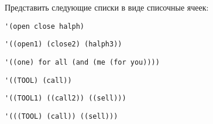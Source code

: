 Представить следующие списки в виде списочные ячеек:

\verb|'(open close halph)|

\begin{figure}[h]
    \centering
    \def\svgwidth{0.8\textwidth}
    
\end{figure}

\verb|'((open1) (close2) (halph3))|

\begin{figure}[h]
    \centering
    \def\svgwidth{0.8\textwidth}
    
\end{figure}

\verb|'((one) for all (and (me (for you))))|

\begin{figure}[h]
    \centering
    \def\svgwidth{\textwidth}
    
\end{figure}

\verb|'((TOOL) (call))|

\begin{figure}[h!]
    \centering
    \def\svgwidth{0.8\textwidth}
    
\end{figure}

\pagebreak

\verb|'((TOOL1) ((call2)) ((sell)))|

\begin{figure}[h]
    \centering
    \def\svgwidth{0.9\textwidth}
    
\end{figure}

\verb|'(((TOOL) (call)) ((sell)))|

\begin{figure}[h]
    \centering
    \def\svgwidth{0.9\textwidth}
    
\end{figure}

